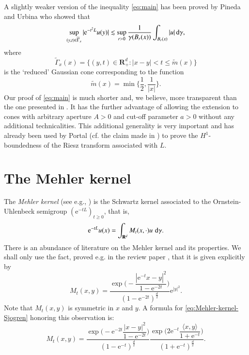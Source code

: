 \documentclass[preprint,12pt]{elsarticle}
\theoremstyle{remark}
\newcommand{\D}{\,\textup{d}}
\newcommand{\la}{\langle}
\newcommand{\ra}{\rangle}
\renewcommand{\leq}{\leqslant}
\renewcommand{\geq}{\geqslant}
\newcommand{\R}{\mathbf R}
\newcommand{\e}{\mathrm{e}} %
\begin{document}
A slightly weaker version of the inequality \eqref{eq:main} has been proved by 
Pineda and Urbina \cite{Pineda2008} who showed that 
\begin{equation*}
  \sup_{(y, t) \in \widetilde{\Gamma}_x} |\e^{-t^2 L} u(y)|
  \lesssim \sup_{r > 0}  \frac1{\gamma(B_r(x))}\int_{B_r(x)} |u| \D\gamma,
\end{equation*}
where
\begin{equation*}
  \widetilde{\Gamma}_x(x) = \{(y, t) \in \R^d_+ : |x - y| < t \leq
  \widetilde{m}(x)\}
\end{equation*}
is the `reduced' Gaussian cone corresponding to the function
\begin{equation*}
  \widetilde{m}(x) = \min\biggl\{\frac12, \frac1{|x|}\biggr\}.
\end{equation*}
Our proof of \eqref{eq:main} is much shorter and, we believe, more transparent
than the one presented in \cite{Pineda2008}. It has the further advantage of
allowing the extension to cones with arbitrary aperture $A > 0$ and cut-off
parameter $a > 0$ without any additional technicalities. This additional
generality is very important and has already been used by Portal (cf. the claim
made in \cite[discussion preceding Lemma 2.3]{Portal2014}) to prove the
$H^1$-boundedness of the Riesz transform associated with $L$.

\section{The Mehler kernel}
The \textit{Mehler kernel} (see e.g., \cite{Sjogren1997}) is the Schwartz
kernel associated to the Ornstein-Uhlenbeck semigroup $(\e^{-tL})_{t \geq 0}$,
that is,
\begin{equation}
  \label{eq:Ornstein-Uhlenbeck-semigroup-integral}
  \e^{-tL} u(x) = \int_{\R^d} M_t(x, \cdot) u \, \D\gamma.
\end{equation}
There is an abundance of literature on the Mehler kernel and its
properties. We shall only use the fact, proved e.g. in the review paper
\cite{Sjogren1997}, that it is given explicitly by
\begin{equation}
  \label{eq:Mehler-kernel-Sjogren}
  M_t(x,y) = \frac{\exp\biggl(-\dfrac{|\e^{-t} x - y|^2}{1 - \e^{-2t}}
    \biggr)}{(1 - \e^{-2t})^{\frac{d}2}} \e^{|y|^2}.
\end{equation}
Note that $M_t(x,y)$ is symmetric in $x$ and $y$. A formula for
\eqref{eq:Mehler-kernel-Sjogren} honoring this observation is:
\begin{equation}
  \label{eq:Mehler-kernel}
  M_t(x, y) = \frac{\exp\biggl(-\e^{-2t} \dfrac{|x - y|^2}{1
      - \e^{-2 t}}  \biggr)}{(1 - \e^{-t})^{\frac{d}2}}
  \frac{\exp\biggl(2\e^{-t} \dfrac{\la x, y \ra}{1 + \e^{-t}}
    \biggr)}{(1 + \e^{-t})^{\frac{d}2}}.
\end{equation}
\end{document}

